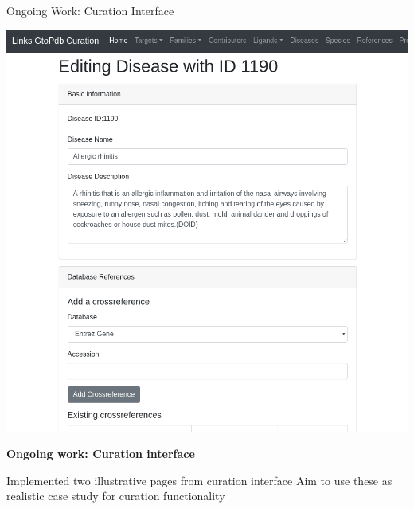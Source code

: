 \documentclass[11.5pt, aspectratio=169]{beamer}
\begin{document}
\begin{frame}{Ongoing Work: Curation Interface}

  \begin{minipage}{0.45\textwidth}
  \begin{center}
    \includegraphics[width=\textwidth]{images/curation-interface.png}
  \end{center}
  \end{minipage}
  \hfill
  \begin{minipage}{0.5\textwidth}
  \begin{fullpageitemize}
  \item {\large \textbf{Ongoing work: Curation interface}}
    \begin{itemize}
      \itemR Implemented two illustrative pages from curation interface
      \itemR Aim to use these as realistic case study for curation functionality
    \end{itemize}
  \end{fullpageitemize}
\end{minipage}
\end{frame}
\end{document}

